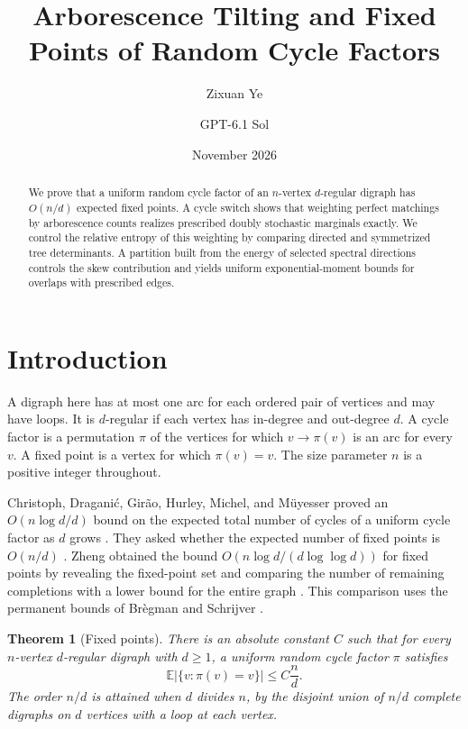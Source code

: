 \documentclass[11pt]{article}
\title{\textbf{Arborescence Tilting and Fixed Points of Random Cycle Factors}}
\author{Zixuan Ye \and GPT-6.1 Sol}
\date{November 2026}
\newcommand{\E}{\mathbb{E}}
\newtheorem{theorem}{Theorem}[section]
\begin{document}
\maketitle

\begin{abstract}
We prove that a uniform random cycle factor of an \(n\)-vertex \(d\)-regular digraph has \(O(n/d)\) expected fixed points. A cycle switch shows that weighting perfect matchings by arborescence counts realizes prescribed doubly stochastic marginals exactly. We control the relative entropy of this weighting by comparing directed and symmetrized tree determinants. A partition built from the energy of selected spectral directions controls the skew contribution and yields uniform exponential-moment bounds for overlaps with prescribed edges.
\end{abstract}

\section{Introduction}

A digraph here has at most one arc for each ordered pair of vertices and may have loops. It is \(d\)-regular if each vertex has in-degree and out-degree \(d\). A cycle factor is a permutation \(\pi\) of the vertices for which \(v\to\pi(v)\) is an arc for every \(v\). A fixed point is a vertex for which \(\pi(v)=v\). The size parameter \(n\) is a positive integer throughout.

Christoph, Dragani\'c, Gir\~ao, Hurley, Michel, and M\"uyesser proved an \(O(n\log d/d)\) bound on the expected total number of cycles of a uniform cycle factor as \(d\) grows \cite{ChristophEtAl}. They asked whether the expected number of fixed points is \(O(n/d)\) \cite[Problem~4.2]{ChristophEtAl}. Zheng obtained the bound \(O(n\log d/(d\log\log d))\) for fixed points by revealing the fixed-point set and comparing the number of remaining completions with a lower bound for the entire graph \cite[Theorem~1.2]{Zheng}. This comparison uses the permanent bounds of Br\`egman and Schrijver \cite{Bregman,Schrijver}.

\begin{theorem}[Fixed points]\label{thm:fixed}
There is an absolute constant \(C\) such that for every \(n\)-vertex \(d\)-regular digraph with \(d\ge 1\), a uniform random cycle factor \(\pi\) satisfies
\[
 \E\bigl|\{v:\pi(v)=v\}\bigr| \le C\frac{n}{d}.
\]
The order \(n/d\) is attained when \(d\) divides \(n\), by the disjoint union of \(n/d\) complete digraphs on \(d\) vertices with a loop at each vertex.
\end{theorem}
\end{document}
